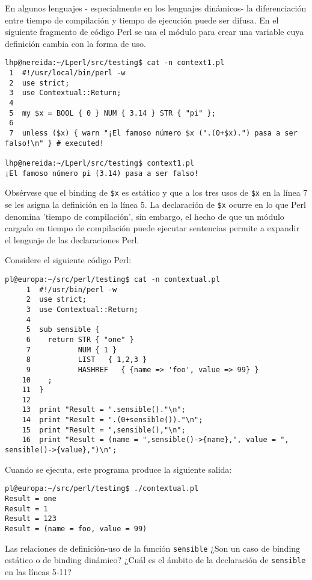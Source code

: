 
En algunos lenguajes - especialmente en los lenguajes dinámicos- la diferenciación 
entre tiempo de compilación y tiempo de ejecución puede ser difusa.
En el siguiente fragmento de código Perl se usa el módulo
para crear una variable cuya definición cambia 
con la forma de uso.

\begin{verbatim}
lhp@nereida:~/Lperl/src/testing$ cat -n context1.pl
 1  #!/usr/local/bin/perl -w
 2  use strict;
 3  use Contextual::Return;
 4
 5  my $x = BOOL { 0 } NUM { 3.14 } STR { "pi" };
 6
 7  unless ($x) { warn "¡El famoso número $x (".(0+$x).") pasa a ser falso!\n" } # executed!

lhp@nereida:~/Lperl/src/testing$ context1.pl
¡El famoso número pi (3.14) pasa a ser falso!
\end{verbatim}

Obsérvese que el binding de \verb|$x| es estático y que a los 
tres usos de \verb|$x| en la línea 7 se les asigna la definición 
en la línea 5.
La declaración de \verb|$x| ocurre en lo que Perl denomina
'tiempo de compilación', 
sin embargo, el hecho de que un módulo cargado en tiempo de compilación
puede ejecutar sentencias permite a 
expandir el lenguaje de las declaraciones Perl.

\begin{exercise}
Considere el siguiente código Perl:
\begin{verbatim}
pl@europa:~/src/perl/testing$ cat -n contextual.pl
     1  #!/usr/bin/perl -w
     2  use strict;
     3  use Contextual::Return;
     4
     5  sub sensible {
     6    return STR { "one" }
     7           NUM { 1 }
     8           LIST   { 1,2,3 }
     9           HASHREF   { {name => 'foo', value => 99} }
    10    ;
    11  }
    12
    13  print "Result = ".sensible()."\n";
    14  print "Result = ".(0+sensible())."\n";
    15  print "Result = ",sensible(),"\n";
    16  print "Result = (name = ",sensible()->{name},", value = ", sensible()->{value},")\n";
\end{verbatim}
Cuando se ejecuta, este programa produce la siguiente salida:
\begin{verbatim}
pl@europa:~/src/perl/testing$ ./contextual.pl
Result = one
Result = 1
Result = 123
Result = (name = foo, value = 99)
\end{verbatim}

Las relaciones de definición-uso de la función \verb|sensible| ¿Son un caso de
binding estático o de binding dinámico?
¿Cuál es el ámbito de la declaración de \verb|sensible| en las líneas 5-11?
\end{exercise}


